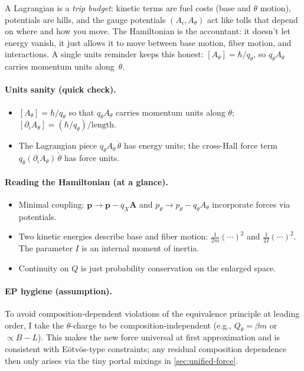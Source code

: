 \begin{idea}
A Lagrangian is a \emph{trip budget}: kinetic terms are fuel costs (base and $\theta$ motion), potentials are hills, and the gauge potentials $(A_i,A_\theta)$ act like tolls that depend on where and how you move. The Hamiltonian is the accountant: it doesn’t let energy vanish, it just allows it to move between base motion, fiber motion, and interactions. A single units reminder keeps this honest: $[A_\theta]=\hbar/q_\theta$, so $q_\theta A_\theta$ carries momentum units along~$\theta$.
\end{idea}

\paragraph{Units sanity (quick check).}
\begin{itemize}
  \item $[A_\theta]=\hbar/q_\theta$ so that $q_\theta A_\theta$ carries momentum units along $\theta$; $[\partial_i A_\theta]= (\hbar/q_\theta)/\text{length}$.
  \item The Lagrangian piece $q_\theta A_\theta\,\dot\theta$ has energy units; the cross-Hall force term $q_\theta (\partial_i A_\theta)\,\dot\theta$ has force units.
\end{itemize}

\paragraph{Reading the Hamiltonian (at a glance).}
\begin{itemize}
  \item Minimal coupling: $\bm p\to \bm p - q_X\bm A$ and $p_\theta\to p_\theta - q_\theta A_\theta$ incorporate forces via potentials.
  \item Two kinetic energies describe base and fiber motion: $\tfrac{1}{2m}(\cdots)^2$ and $\tfrac{1}{2I}(\cdots)^2$. The parameter $I$ is an internal moment of inertia.
  \item Continuity on $Q$ is just probability conservation on the enlarged space.
\end{itemize}

\paragraph{EP hygiene (assumption).} To avoid composition-dependent violations of the equivalence principle at leading order, I take the $\theta$-charge to be composition-independent (e.g., $Q_\theta=\beta m$ or $\propto B\! -\!L$). This makes the new force universal at first approximation and is consistent with E\"otv\"os-type constraints; any residual composition dependence then only arises via the tiny portal mixings in \cref{sec:unified-force}.

